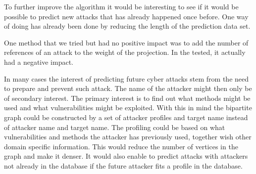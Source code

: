 To further improve the algorithm it would be interesting to see if it would be possible to predict new attacks that has already happened once before. One way of doing has already been done by reducing the length of the prediction data set.

One method that we tried but had no positive impact was to add the number of references of an attack to the weight of the projection. In the tested, it actually had a negative impact.

In many cases the interest of predicting future cyber attacks stem from the need to prepare and prevent such attack. The name of the attacker might then only be of secondary interest. The primary interest is to find out what methods might be used and what vulnerabilities might be exploited. With this in mind the bipartite graph could be constructed by a set of attacker profiles and target name instead of attacker name and target name. The profiling could be based on what vulnerabilities and methods the attacker has previously used, together wish other domain specific information. This would reduce the number of vertices in the graph and make it denser. It would also enable to predict attacks with attackers not already in the database if the future attacker fits a profile in the database.
